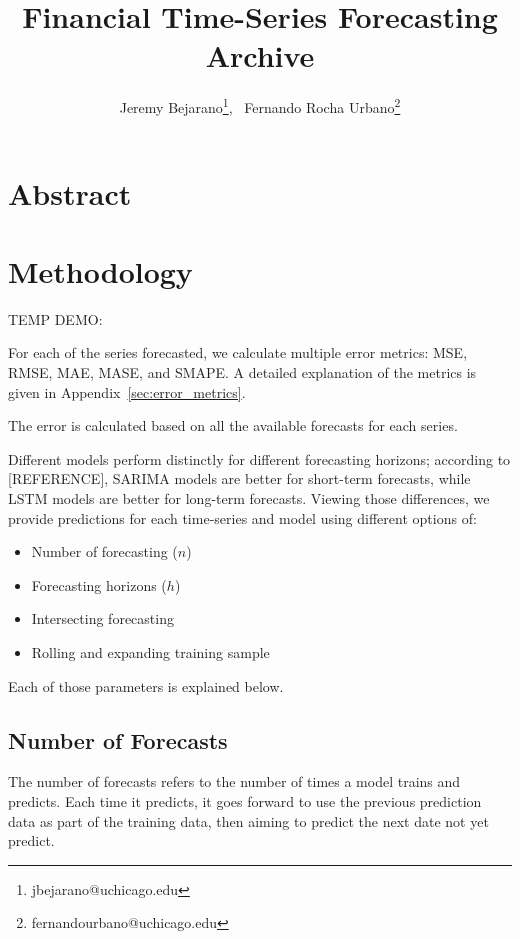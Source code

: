 \documentclass{article}
\title{Financial Time-Series Forecasting Archive}
\author{Jeremy Bejarano\footnote{jbejarano@uchicago.edu}, \ Fernando Rocha Urbano\footnote{fernandourbano@uchicago.edu}}
\numberwithin{equation}{section}
\begin{document}
\begin{titlepage}
    \vfill
    \maketitle
    \vfill
\end{titlepage}

\section{Abstract}

\section{Methodology}

TEMP DEMO:

\begin{table}

\end{table}



For each of the series forecasted, we calculate multiple error metrics: MSE, RMSE, MAE, MASE, and SMAPE. A detailed explanation of the metrics is given in Appendix~\ref{sec:error_metrics}.

The error is calculated based on all the available forecasts for each series.

Different models perform distinctly for different forecasting horizons; according to [REFERENCE], SARIMA models are better for short-term forecasts, while LSTM models are better for long-term forecasts. Viewing those differences, we provide predictions for each time-series and model using different options of:
\begin{itemize}
    \item Number of forecasting ($n$)
    \item Forecasting horizons ($h$)
    \item Intersecting forecasting
    \item Rolling and expanding training sample
\end{itemize}
Each of those parameters is explained below.

\subsection{Number of Forecasts}

The number of forecasts refers to the number of times a model trains and predicts. Each time it predicts, it goes forward to use the previous prediction data as part of the training data, then aiming to predict the next date not yet predict.
\end{document}

